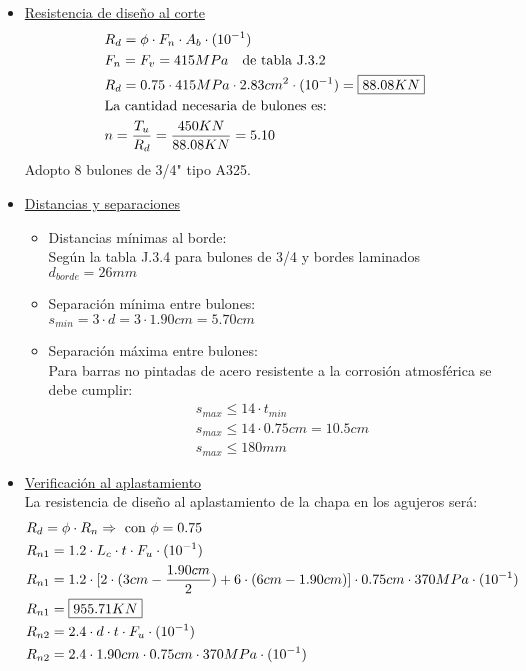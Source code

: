 \begin{enumerate}
\begin{itemize}
\item \underline{Resistencia de diseño al corte}
\begin{align*}
& R_d = \phi \cdot F_n \cdot A_b \cdot (10^{-1})\\
& F_n = F_v = 415MPa \quad \text{de tabla J.3.2}\\
& R_d = 0.75 \cdot 415 MPa \cdot 2.83 cm^2 \cdot (10^{-1}) = \framebox{$88.08 KN$}\\
& \text{La cantidad necesaria de bulones es:}\\
& n = \frac{T_u}{R_d} = \frac{450KN}{88.08 KN} = 5.10
\end{align*}
Adopto 8 bulones de 3/4" tipo A325.
\newpage
\item \underline{Distancias y separaciones}
	\begin{itemize}
	\item Distancias mínimas al borde:\\
	Según la tabla J.3.4 para bulones de 3/4 y bordes laminados $d_{borde} = 26 mm$
	\item Separación mínima entre bulones:\\
	$s_{min} = 3 \cdot d = 3 \cdot 1.90cm = 5.70cm$
	\item Separación máxima entre bulones:\\
	Para barras no pintadas de acero resistente a la corrosión atmosférica se debe cumplir:
	\begin{align*}
	& s_{max} \leq 14 \cdot t_{min}\\
	& s_{max} \leq 14 \cdot 0.75cm = 10.5cm\\
	& s_{max} \leq 180mm
	\end{align*}
	\end{itemize}
\item \underline{Verificación al aplastamiento}\\
La resistencia de diseño al aplastamiento de la chapa en los agujeros será:
\begin{align*}
& R_d = \phi \cdot R_n \Rightarrow \text{ con } \phi = 0.75\\
& R_{n1} = 1.2 \cdot L_c \cdot t \cdot F_u \cdot (10^{-1})\\
& R_{n1} = 1.2 \cdot [2 \cdot (3cm - \frac{1.90cm}{2})+ 6 \cdot (6cm - 1.90cm)]\cdot 0.75cm \cdot 370MPa \cdot (10^{-1})\\
& R_{n1} = \framebox{$955.71 KN$}\\
& R_{n2} = 2.4 \cdot d \cdot t \cdot F_u \cdot (10^{-1})\\
& R_{n2} = 2.4 \cdot 1.90cm \cdot 0.75cm \cdot 370MPa \cdot (10^{-1})\\

\end{align*}
\end{itemize}
\end{enumerate}
